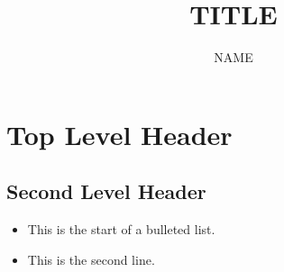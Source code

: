 \documentclass[10pt]{article}
\title{TITLE}
\author{NAME}
\begin{document}
\maketitle  


\section{Top Level Header}
\subsection{Second Level Header}
\begin{itemize}
    \item This is the start of a bulleted list.
    \item This is the second line.
\end{itemize}
\end{document}
